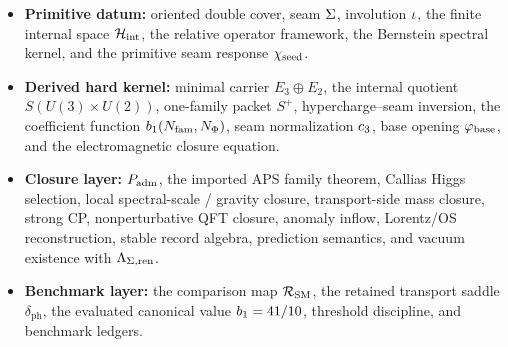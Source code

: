 \begin{tcolorbox}[colback=gray!4, colframe=gray!60, breakable,
    title={\textbf{Datum Hierarchy for the Present Draft}}, fonttitle=\bfseries]
\begin{itemize}[leftmargin=1.5em, topsep=3pt, itemsep=3pt]
    \item \textbf{Primitive datum:} oriented double cover, seam $\Sigma$, involution $\iota$, the finite internal space $\mathcal H_{\mathrm{int}}$, the relative operator framework, the Bernstein spectral kernel, and the primitive seam response $\chi_{\mathrm{seed}}$.
    \item \textbf{Derived hard kernel:} minimal carrier $E_3\oplus E_2$, the internal quotient $S(U(3)\times U(2))$, one-family packet $S^+$, hypercharge--seam inversion, the coefficient function $b_1(N_{\mathrm{fam}},N_\Phi)$, seam normalization $c_3$, base opening $\varphi_{\mathrm{base}}$, and the electromagnetic closure equation.
    \item \textbf{Closure layer:} $P_{\mathrm{adm}}$, the imported APS family theorem, Callias Higgs selection, local spectral-scale / gravity closure, transport-side mass closure, strong CP, nonperturbative QFT closure, anomaly inflow, Lorentz/OS reconstruction, stable record algebra, prediction semantics, and vacuum existence with $\Lambda_{\Sigma,\mathrm{ren}}$.
    \item \textbf{Benchmark layer:} the comparison map $\mathcal R_{\mathrm{SM}}$, the retained transport saddle $\delta_{\mathrm{ph}}$, the evaluated canonical value $b_1=41/10$, threshold discipline, and benchmark ledgers.
\end{itemize}
\end{tcolorbox}

